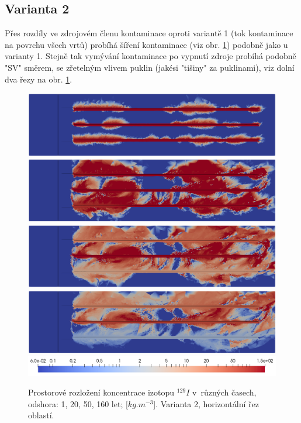 \documentclass[11pt,a4paper]{article}
\newcommand{\obraz}[1]{(viz obr. \ref{#1})}
\begin{document}
\begin{onehalfspacing}
\subsection{Varianta 2}

Přes rozdíly ve zdrojovém členu kontaminace oproti variantě 1 (tok kontaminace na povrchu všech vrtů) probíhá šíření kontaminace \obraz{var2} podobně jako u varianty 1. Stejně tak vymývání kontaminace po vypnutí zdroje probíhá podobně "SV" směrem, se zřetelným vlivem puklin (jakési "tišiny" za puklinami), viz dolní dva řezy na obr. \ref{var2}.

\begin{figure}[H]
\centering
\includegraphics[width=16cm]{graphics/obr_ralek/var2/001a.png}
\includegraphics[width=16cm]{graphics/obr_ralek/var2/020a.png}
\includegraphics[width=16cm]{graphics/obr_ralek/var2/050a.png}
\includegraphics[width=16cm]{graphics/obr_ralek/var2/160a.png}
\includegraphics[width=16cm]{graphics/obr_ralek/var2/skala_var2.png}
\caption{Prostorové rozložení koncentrace izotopu $^{129}I$ v~různých časech, odshora: 1, 20, 50, 160 let; [$kg.m^{-3}$]. Varianta 2, horizontální řez oblastí.}
\label{var2}
\end{figure}


\end{onehalfspacing}
\end{document}
